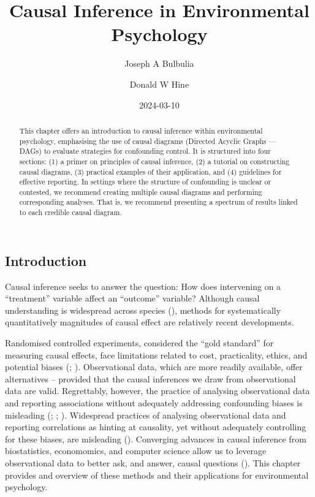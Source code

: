 \documentclass[
  singlecolumn]{article}
\title{Causal Inference in Environmental Psychology}
\author{Joseph A Bulbulia \and Donald W Hine}
\date{2024-03-10}
\begin{document}
\maketitle
\begin{abstract}
This chapter offers an introduction to causal inference within
environmental psychology, emphasising the use of causal diagrams
(Directed Acyclic Graphs --- DAGs) to evaluate strategies for
confounding control. It is structured into four sections: (1) a primer
on principles of causal inference, (2) a tutorial on constructing causal
diagrams, (3) practical examples of their application, and (4)
guidelines for effective reporting. In settings where the structure of
confounding is unclear or contested, we recommend creating multiple
causal diagrams and performing corresponding analyses. That is, we
recommend presenting a spectrum of results linked to each credible
causal diagram.
\end{abstract}

\subsection{Introduction}\label{introduction}

Causal inference seeks to answer the question: How does intervening on a
``treatment'' variable affect an ``outcome'' variable? Although causal
understanding is widespread across species
(), methods for
systematically quantitatively magnitudes of causal effect are relatively
recent developments.

Randomised controlled experiments, considered the ``gold standard'' for
measuring causal effects, face limitations related to cost,
practicality, ethics, and potential biases
(;
).
Observational data, which are more readily available, offer alternatives
-- provided that the causal inferences we draw from observational data
are valid. Regrettably, however, the practice of analysing observational
data and reporting associations without adequately addressing
confounding biases is misleading (; ;
). Widespread
practices of analysing observational data and reporting correlations as
hinting at causality, yet without adequately controlling for these
biases, are misleading (). Converging advances in causal inference from biostatistics,
economomics, and computer science allow us to leverage observational
data to better ask, and answer, causal questions
(). This chapter
provides and overview of these methods and their applications for
environmental psychology.
\end{document}
